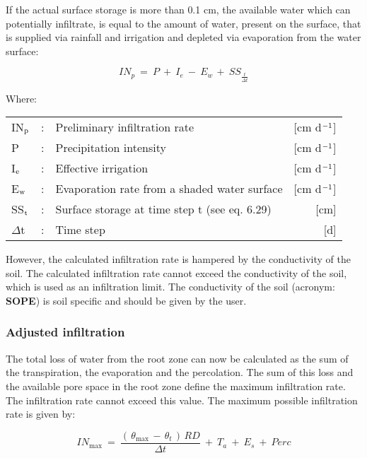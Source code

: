 If the actual surface storage is more than 0.1 cm, the available water which can 
potentially infiltrate, is equal to the amount of water, present on the surface, that is supplied via
rainfall and irrigation and depleted via evaporation from the water surface:

\begin{equation}
\label{eq:6.27}
IN_{p} ~=~P~+~I _{e} ~-~ E _{w~} +~ SS _{\frac{t}{\Delta t}} 
\end{equation}

Where:\\[5pt]
\begin{tabularx}{\textwidth}{llXr}
	IN$_{{\rm p}}$ &:& Preliminary infiltration rate  & [cm d$^{{\rm -1}}$]\\
	P &:& Precipitation intensity  & [cm d$^{{\rm -1}}$]\\
	I$_{{\rm e}}$ &:& Effective irrigation  & [cm d$^{{\rm -1}}$]\\
	E$_{{\rm w}}$ &:& Evaporation rate from a shaded water surface  & [cm d$^{{\rm -1}}$]\\
	SS$_{{\rm t}}$ &:& Surface storage at time step t (see eq. 6.29)  & [cm]\\
	$\Delta$t &:& Time step  & [d]\\
\end{tabularx}

However, the calculated infiltration rate is hampered by the conductivity of the soil. The calculated
infiltration rate cannot exceed the conductivity of the soil, which is used as an infiltration
limit. The conductivity of the soil (acronym: {\bf SOPE}) is soil specific and should be given
by the user.

\subsubsection{Adjusted infiltration}
The total loss of water from the root zone can now be calculated as the sum of the
transpiration, the evaporation and the percolation. The sum of this loss and the available
pore space in the root zone define the maximum infiltration rate. The 
infiltration rate cannot exceed this value. The maximum possible infiltration rate is given
by:

\begin{equation}
\label{eq:6.28}
IN_{\max } ~=~{\frac{(\, \theta  _{\max } \, -\, \theta  _{t} \, )\, RD}{\Delta t}} ~+~ T _{a} ~+~ E _{s} ~+~ Perc
\end{equation}

